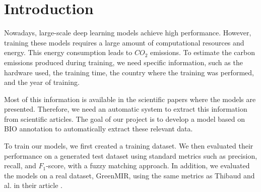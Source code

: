 \documentclass{article}
\theoremstyle{plain}
\theoremstyle{definition}
\theoremstyle{remark}
\begin{document}
\printAffiliationsAndNotice{\icmlEqualContribution} %
\begin{abstract}
Recent advances in deep learning have increased interest in the environmental impact of machine learning models. Several studies aim to estimate carbon emissions using information reported in scientific publications.In this work, we propose an automatic approach to extract experimental variables from scientific articles based on Named Entity Recognition (NER). Our method uses BIO sequence tagging models trained on synthetically generated data and relies on BERT-based language representations to identify the key information required for carbon footprint estimation. Results show that, despite the structural heterogeneity of scientific papers, explicitly mentioned entities can be effectively extracted within a local context. Context window size significantly affects performance, highlighting a trade-off between precision and recall. Finally, synthetic data generation appears to be a relevant solution when annotated corpora are unavailable, provided sufficient diversity to ensure generalization.
\end{abstract}

\section{Introduction}

Nowadays, large-scale deep learning models achieve high performance. However, training these models requires a large amount of computational resources and energy. This energy consumption leads to $CO_{2}$ emissions. To estimate the carbon emissions produced during training, we need specific information, such as the hardware used, the training time, the country where the training was performed, and the year of training.

Most of this information is available in the scientific papers where the models are presented. Therefore, we need an automatic system to extract this information from scientific articles. The goal of our project is to develop a model based on BIO annotation to automatically extract these relevant data.

To train our models, we first created a training dataset. We then evaluated their performance on a generated test dataset using standard metrics such as precision, recall, and $F_{1}$-score, with a fuzzy matching approach. In addition, we evaluated the models on a real dataset, GreenMIR, using the same metrics as Thibaud and al. in their article \cite{greenwade93}.
\end{document}
